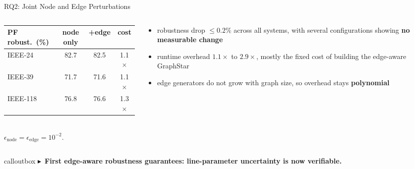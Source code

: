 \documentclass[11pt,aspectratio=169,t]{beamer}
\newcommand{\good}[1]{\textbf{\textcolor{safegreen}{#1}}}
\newcommand{\takeaway}[1]{\vfill
  \nointerlineskip%
  \begin{beamercolorbox}[wd=\textwidth, sep=0.6ex, rounded=true]{calloutbox}%
    \small\textcolor{VUgoldDark}{$\blacktriangleright$}~\textbf{#1}%
  \end{beamercolorbox}}
\begin{document}
\begin{frame}{RQ2: Joint Node and Edge Perturbations}
  \begin{columns}[T,onlytextwidth]
    \begin{column}{0.47\textwidth}
      {\small\renewcommand{\arraystretch}{1.25}
      \begin{tabular}{@{}lccc@{}}
        \toprule
        PF robust.\ (\%) & node only & +edge & cost\\
        \midrule
        IEEE-24  & 82.7 & 82.5 & 1.1$\times$\\
        IEEE-39  & 71.7 & 71.6 & 1.1$\times$\\
        IEEE-118 & 76.8 & 76.6 & 1.3$\times$\\
        \bottomrule
      \end{tabular}}\\[1ex]
      {\footnotesize $\epsilon_{\text{node}} = \epsilon_{\text{edge}} = 10^{-2}$.}
    \end{column}
    \begin{column}{0.49\textwidth}
      \begin{itemize}\itemsep=1.1ex
        \item robustness drop $\le 0.2\%$ across all systems, with several
              configurations showing \good{no measurable change}
        \item runtime overhead $1.1\times$ to $2.9\times$, mostly the fixed
              cost of building the edge-aware GraphStar
        \item edge generators do not grow with graph size, so overhead stays
              \good{polynomial}
      \end{itemize}
    \end{column}
  \end{columns}
  \takeaway{First edge-aware robustness guarantees: line-parameter uncertainty is now verifiable.}
\end{frame}
\end{document}
